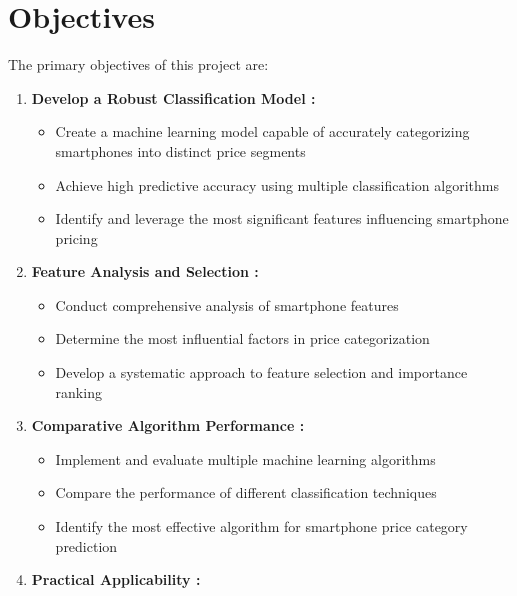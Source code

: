 \documentclass[12pt]{report}
\begin{document}
\section{Objectives}
The primary objectives of this project are:
\vspace{-1.25em}
\begin{enumerate}
	\setlength\itemsep{-1.05em}
	\item{\textbf{Develop a Robust Classification Model :}}
	      \vspace{-1.65em}
	      \begin{itemize}
		      \setlength\itemsep{-1.5em}
		      \item Create a machine learning model capable of accurately categorizing smartphones into distinct price segments
		      \item Achieve high predictive accuracy using multiple classification algorithms
		      \item Identify and leverage the most significant features influencing smartphone pricing
	      \end{itemize}
	\item{\textbf{Feature Analysis and Selection :}}
	      \vspace{-1.65em}
	      \begin{itemize}
		      \setlength\itemsep{-1.5em}
		      \item Conduct comprehensive analysis of smartphone features
		      \item Determine the most influential factors in price categorization
		      \item Develop a systematic approach to feature selection and importance ranking
	      \end{itemize}
	\item{\textbf{Comparative Algorithm Performance :}}
	      \vspace{-1.65em}
	      \begin{itemize}
		      \setlength\itemsep{-1.5em}
		      \item Implement and evaluate multiple machine learning algorithms
		      \item Compare the performance of different classification techniques
		      \item Identify the most effective algorithm for smartphone price category prediction
	      \end{itemize}
	\item{\textbf{Practical Applicability :}}
	      \vspace{-1.65em}

\end{enumerate}
\end{document}
